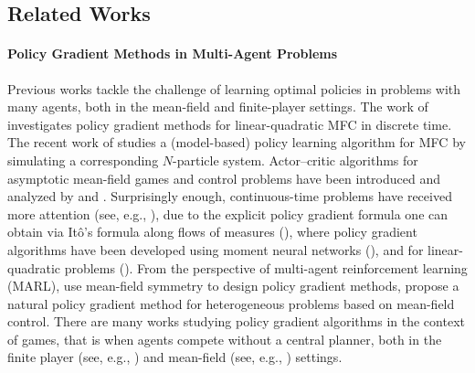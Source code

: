 \documentclass[11pt]{article}
\numberwithin{equation}{section}
\theoremstyle{definition}
\theoremstyle{remark}
\newcommand{\citet}{\cite}
\begin{document}
\subsection{Related Works}

\paragraph{Policy Gradient Methods in Multi-Agent Problems}

Previous works tackle the challenge of learning optimal policies in problems with many agents, both in the mean-field and finite-player settings.
The work of \citet{carmona2019linear} investigates policy gradient methods for linear-quadratic MFC in discrete time.
The recent work of \citet{soner2025learning} studies a (model-based) policy learning algorithm for MFC by simulating a corresponding $N$-particle system.
Actor--critic algorithms for asymptotic mean-field games and control problems have been introduced and analyzed by \citet{angiuli2023deep} and \citet{fouque2025convergence}. 
Surprisingly enough, continuous-time problems have received more attention (see, e.g., \citet{fouque2020deep}), due to the explicit policy gradient formula one can obtain via Itô's formula along flows of measures (\citet{frikha2025actor}), where policy gradient algorithms have been developed using moment neural networks (\citet{pham2025actor}), and for linear-quadratic problems (\citet{wang2021global, frikha2024full}).
From the perspective of multi-agent reinforcement learning (MARL), \citet{yang2018mean} use mean-field symmetry to design policy gradient methods, \citet{mondal2022approximation} propose a natural policy gradient method for heterogeneous problems based on mean-field control.
There are many works studying policy gradient algorithms in the context of games, that is when agents compete without a central planner, both in the finite player (see, e.g., \citet{hambly2023policy, giannou2022convergence}) and mean-field (see, e.g., \citet{subramanian2019reinforcement, fu2020actor, guo2023general, liang2024actor}) settings.
\end{document}
